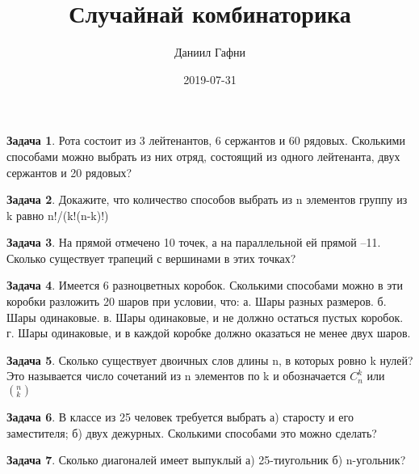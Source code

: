 \documentclass[a4paper,11pt]{article}%
\title{Случайнай комбинаторика}%
\author{Даниил Гафни}%
\date{2019{-}07{-}31}%
\theoremstyle{definition}%
\newtheorem{Ex}{\hspace{-25pt}\fbox{\phantom{123}} Задача}%
\begin{document}
%
\normalsize%
\maketitle%
\begin{Ex}%
Рота состоит из 3 лейтенантов, 6 сержантов и 60 рядовых. Сколькими способами
можно выбрать из них отряд, состоящий из одного лейтенанта, двух сержантов и 20
рядовых?%
%
\end{Ex}%
%
\iffalse%
Автор: 25 школа%
Дата: 01.07.2017%
Название: None%
Подсказка: \textbackslash{}\textbackslash{}%
nan%
\fi%
%
\begin{Ex}%
Докажите, что количество способов выбрать из n элементов  группу из k равно n!/(k!(n-k)!)%
%
\end{Ex}%
%
\iffalse%
Автор: 25 школа%
Дата: 01.07.2017%
Название: None%
Подсказка: \textbackslash{}\textbackslash{}%
nan%
\fi%
%
\begin{Ex}%
На прямой отмечено 10 точек, а на параллельной ей прямой –11. Сколько
существует трапеций с вершинами в этих точках?%
%
\end{Ex}%
%
\iffalse%
Автор: 25 школа%
Дата: 01.07.2017%
Название: None%
Подсказка: \textbackslash{}\textbackslash{}%
nan%
\fi%
%
\begin{Ex}%
Имеется 6 разноцветных коробок. Сколькими способами можно в эти коробки
разложить 20 шаров при условии, что:
а. Шары разных размеров.
б. Шары одинаковые.
в. Шары одинаковые, и не должно остаться пустых коробок.
г. Шары одинаковые, и в каждой коробке должно оказаться не менее двух шаров.%
%
\end{Ex}%
%
\iffalse%
Автор: Дмитрий Трущин%
Дата: 01.10.2013%
Название: None%
Подсказка: \textbackslash{}\textbackslash{}%
nan%
\fi%
%
\begin{Ex}%
Сколько существует двоичных слов длины n, в которых ровно k нулей? Это называется число сочетаний из n элементов по k и обозначается $C_n^k$ или $(^n_k)$%
%
\end{Ex}%
%
\iffalse%
Автор: Ираклий Гагуа%
Дата: 07.01.2011%
Название: None%
Подсказка: \textbackslash{}\textbackslash{}%
nan%
\fi%
%
\begin{Ex}%
В классе из 25 человек требуется выбрать а) старосту и его заместителя; б)
двух дежурных. Сколькими способами это можно сделать?%
%
\end{Ex}%
%
\iffalse%
Автор: 25 школа%
Дата: 01.11.2012%
Название: None%
Подсказка: \textbackslash{}\textbackslash{}%
nan%
\fi%
%
\begin{Ex}%
Сколько диагоналей имеет выпуклый а) 25-тиугольник б) n-угольник?%
%
\end{Ex}%
\end{document}
